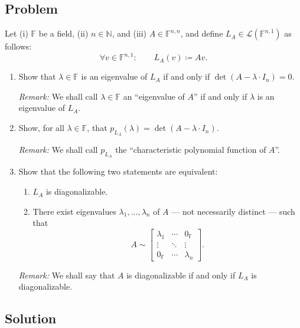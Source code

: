 \documentclass[12pt]{article}
\newcommand{\df}{\coloneqq}
\newcommand{\F}{\mathbb{F}}
\newcommand{\cL}{\mathcal{L}}
\begin{document}
\subsection{Problem}
Let (i) $\F$ be a field, (ii) $n \in \mathbb{N}$, and (iii) $A \in \F^{n,n}$, and define $L_A \in \cL(\F^{n,1})$ as follows:
\[
\forall v \in \F^{n,1}:\qquad L_A(v)\df Av.
\]
\begin{enumerate}[label=(\alph*)]
\item Show that $\lambda \in \F$ is an eigenvalue of $L_A$ if and only if $\det(A-\lambda\cdot I_n)=0$.

\smallskip
\noindent\textit{Remark:} We shall call $\lambda \in \F$ an ``eigenvalue of $A$'' if and only if $\lambda$ is an eigenvalue of $L_A$.

\item Show, for all $\lambda \in \F$, that $p_{L_A}(\lambda)=\det(A-\lambda\cdot I_n)$.

\smallskip
\noindent\textit{Remark:} We shall call $p_{L_A}$ the ``characteristic polynomial function of $A$''.

\item Show that the following two statements are equivalent:
\begin{enumerate}[label=(\arabic*)]
\item $L_A$ is diagonalizable.
\item There exist eigenvalues $\lambda_1,\dots,\lambda_n$ of $A$ --- not necessarily distinct --- such that
\[
A \sim
\begin{bmatrix}
\lambda_1 & \cdots & 0_{\F}\\
\vdots & \ddots & \vdots\\
0_{\F} & \cdots & \lambda_n
\end{bmatrix}.
\]
\end{enumerate}

\smallskip
\noindent\textit{Remark:} We shall say that $A$ is diagonalizable if and only if $L_A$ is diagonalizable.
\end{enumerate}

\newpage
\subsection{Solution}
\end{document}
